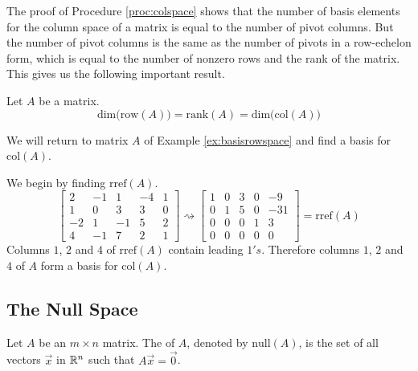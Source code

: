 \documentclass{ximera}
\begin{document}
The proof of Procedure \ref{proc:colspace} shows that the number of basis elements for the column space of a matrix is equal to the number of pivot columns.  But the number of pivot columns is the same as the number of pivots in a row-echelon form, which is equal to the number of nonzero rows and the rank of the matrix.  This gives us the following important result.
\begin{theorem}
Let $A$ be a matrix.
$$\mbox{dim}\Big(\mbox{row}(A)\Big)=\mbox{rank}(A)=\mbox{dim}\Big(\mbox{col}(A)\Big)$$
\end{theorem}

\begin{example}\label{ex:basiscolspace}
We will return to matrix $A$ of Example \ref{ex:basisrowspace} and find a basis for $\mbox{col}(A)$.
\begin{explanation}
We begin by finding $\mbox{rref}(A)$.
$$\begin{bmatrix}2&-1&1&-4&1\\1&0&3&3&0\\-2&1&-1&5&2\\4&-1&7&2&1\end{bmatrix}\rightsquigarrow\begin{bmatrix}1&0&3&0&-9\\0&1&5&0&-31\\0&0&0&1&3\\0&0&0&0&0\end{bmatrix}=\mbox{rref}(A)$$
Columns $1$, $2$ and $4$ of $\mbox{rref}(A)$ contain leading $1's$.  Therefore columns $1$, $2$ and $4$ of $A$ form a basis for $\mbox{col}(A)$.
\end{explanation}

\end{example}

\subsection*{The Null Space}
\begin{definition}\label{def:nullspace} Let $A$ be an $m\times n$ matrix.  The  of $A$, denoted by $\mbox{null}(A)$, is the set of all vectors $\vec{x}$ in $\mathbb{R}^n$ such that $A\vec{x}=\vec{0}$.
\end{definition}
\end{document}
